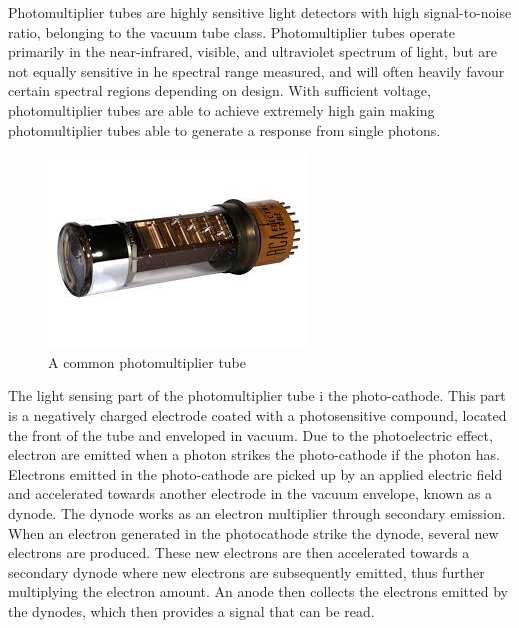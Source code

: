 Photomultiplier tubes are highly sensitive light detectors with high signal-to-noise ratio, belonging to the vacuum tube class. Photomultiplier tubes operate primarily in the near-infrared, visible, and ultraviolet spectrum of light, but are not equally sensitive in he spectral range measured, and will often heavily favour certain spectral regions depending on design. With sufficient voltage, photomultiplier tubes are able to achieve extremely high gain making photomultiplier tubes able to generate a response from single photons.

\begin{figure}[htb]
\begin{center}
\includegraphics[scale=0.6]{figures/RCS/photomultiplier_tube}
\caption{A common photomultiplier tube}
\label{fig:PMT}
\end{center}
\end{figure}

The light sensing part of the photomultiplier tube i the photo-cathode. This part is a negatively charged electrode coated with a photosensitive compound, located  the front of the tube and enveloped in vacuum. Due to the photoelectric effect, electron are emitted when a photon strikes the photo-cathode if the photon has. Electrons emitted in the photo-cathode are picked up by an applied electric field and accelerated towards another electrode in the vacuum envelope, known as a dynode. The dynode works as an electron multiplier through secondary emission. When an electron generated in the photocathode strike the dynode, several new electrons are produced. These new electrons are then accelerated towards a secondary dynode where new electrons are subsequently emitted, thus further multiplying the electron amount. An anode then collects the electrons emitted by the dynodes, which then provides a signal that can be read.

